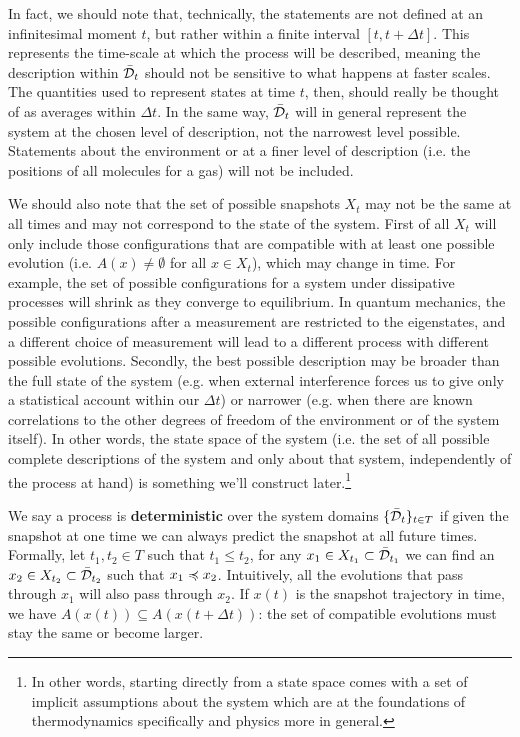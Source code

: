 \documentclass[letterpaper]{article}
\begin{document}
In fact, we should note that, technically, the statements are not defined at an infinitesimal moment $t$, but rather within a finite interval $[t, t + \Delta t]$. This represents the time-scale at which the process will be described, meaning the description within $\bar{\mathcal{D}}_t$ should not be sensitive to what happens at faster scales. The quantities used to represent states at time $t$, then, should really be thought of as averages within $\Delta t$. In the same way, $\bar{\mathcal{D}}_t$ will in general represent the system at the chosen level of description, not the narrowest level possible. Statements about the environment or at a finer level of description (i.e. the positions of all molecules for a gas) will not be included.

We should also note that the set of possible snapshots $X_t$ may not be the same at all times and may not correspond to the state of the system. First of all $X_t$ will only include those configurations that are compatible with at least one possible evolution (i.e. $A(x) \neq \emptyset$ for all $x \in X_t$), which may change in time. For example, the set of possible configurations for a system under dissipative processes will shrink as they converge to equilibrium. In quantum mechanics, the possible configurations after a measurement are restricted to the eigenstates, and a different choice of measurement will lead to a different process with different possible evolutions. Secondly, the best possible description may be broader than the full state of the system (e.g. when external interference forces us to give only a statistical account within our $\Delta t$) or narrower (e.g. when there are known correlations to the other degrees of freedom of the environment or of the system itself). In other words, the state space of the system (i.e. the set of all possible complete descriptions of the system and only about that system, independently of the process at hand) is something we'll construct later.\footnote{In other words, starting directly from a state space comes with a set of implicit assumptions about the system which are at the foundations of thermodynamics specifically and physics more in general.}

We say a process is \textbf{deterministic} over the system domains $\{\bar{\mathcal{D}}_t\}_{t \in T}$ if given the snapshot at one time we can always predict the snapshot at all future times. Formally, let $t_1, t_2 \in T$ such that $t_1 \leq t_2$, for any $x_1 \in X_{t_1} \subset \bar{\mathcal{D}}_{t_1}$ we can find an $x_2 \in X_{t_2} \subset \bar{\mathcal{D}}_{t_2}$ such that $x_1 \preccurlyeq x_2$. Intuitively, all the evolutions that pass through $x_1$ will also pass through $x_2$. If $x(t)$ is the snapshot trajectory in time, we have $A(x(t)) \subseteq A(x(t + \Delta t))$: the set of compatible evolutions must stay the same or become larger.
\end{document}
